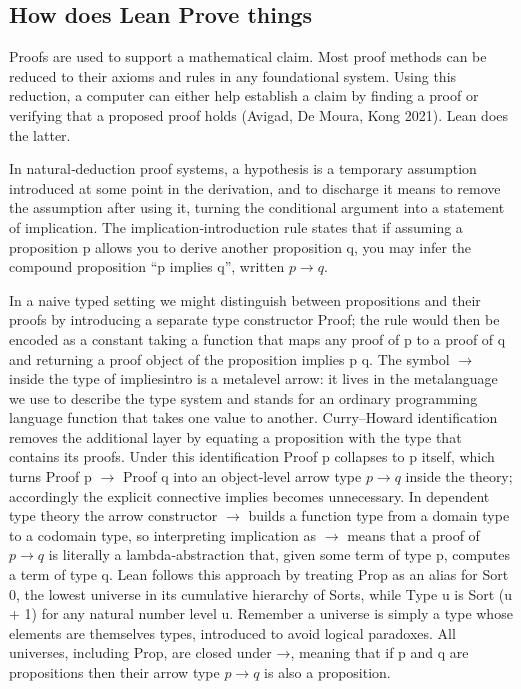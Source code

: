 \documentclass{article}
\begin{document}
\subsection{How does Lean Prove things}

Proofs are used to support a mathematical claim. Most proof methods can be reduced to their axioms and rules in any foundational system. Using this reduction, a computer can either help establish a claim by finding a proof or verifying that a proposed proof holds (Avigad, De Moura,  Kong 2021). Lean does the latter. 

In natural‑deduction proof systems, a hypothesis is a temporary assumption introduced at some point in the derivation, and to discharge it means to remove the assumption after using it, turning the conditional argument into a statement of implication. The implication‑introduction rule states that if assuming a proposition p allows you to derive another proposition q, you may infer the compound proposition “p implies q”, written $p\rightarrow q$. 

In a naive typed setting we might distinguish between propositions and their proofs by introducing a separate type constructor Proof; the rule would then be encoded as a constant taking a function that maps any proof of p to a proof of q and returning a proof object of the proposition implies p q. The symbol $\rightarrow$ inside the type of impliesintro is a metalevel arrow: it lives in the metalanguage we use to describe the type system and stands for an ordinary programming language function that takes one value to another. Curry–Howard identification removes the additional layer by equating a proposition with the type that contains its proofs. Under this identification Proof p collapses to p itself, which turns Proof p $\rightarrow$ Proof q into an object‑level arrow type $p\rightarrow q$ inside the theory; accordingly the explicit connective implies becomes unnecessary. In dependent type theory the arrow constructor $\rightarrow$ builds a function type from a domain type to a codomain type, so interpreting implication as $\rightarrow$ means that a proof of $p→q$ is literally a lambda‑abstraction that, given some term of type p, computes a term of type q. Lean follows this approach by treating Prop as an alias for Sort 0, the lowest universe in its cumulative hierarchy of Sorts, while Type u is Sort (u + 1) for any natural number level u. Remember a universe is simply a type whose elements are themselves types, introduced to avoid logical paradoxes. All universes, including Prop, are closed under →, meaning that if p and q are propositions then their arrow type $p→q$ is also a proposition. 
\end{document}
